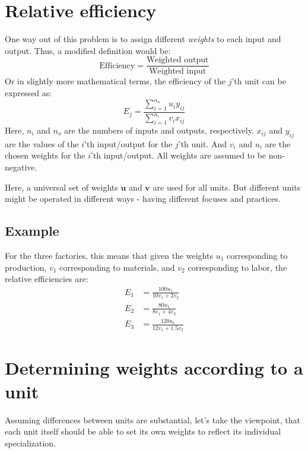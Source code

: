 \documentclass[12pt, a4paper]{article}
\numberwithin{equation}{section}
\begin{document}
\section{Relative efficiency}
One way out of this problem is to assign different \textit{weights} to each input and output. Thus, a modified definition would be:
\begin{equation}
\textrm{Efficiency}=\frac{\textrm{Weighted output}}{\textrm{Weighted input}}
\end{equation}
Or in slightly more mathematical terms, the efficiency of the $j$'th unit can be expressed as:
\begin{equation}
E_j=\frac{\sum_{i=1}^{n_o}u_i y_{ij}}{\sum_{i=1}^{n_i}v_i x_{ij}}
\end{equation}
Here, $n_i$ and $n_o$ are the numbers of inputs and outputs, respectively. $x_{ij}$ and $y_{ij}$ are the values of the $i$'th input/output for the $j$'th unit. And $v_i$ and $u_i$ are the chosen weights for the $i$'th input/output. All weights are assumed to be non-negative.

Here, a universal set of weights $\mathbf{u}$ and $\mathbf{v}$ are used for all units. But different units might be operated in different ways - having different focuses and practices.

\subsection{Example}
For the three factories, this means that given the weights $u_1$ corresponding to production, $v_1$ corresponding to materials, and $v_2$ corresponding to labor, the relative efficiencies are:
\begin{align}
E_1&=\frac{100 u_1}{10 v_1+2 v_2}\\
E_2&=\frac{80 u_1}{8 v_1+4 v_2}\\
E_3&=\frac{120 u_1}{12 v_1+1.5 v_2}
\end{align}

\section{Determining weights according to a unit}
Assuming differences between units are substantial, let's take the viewpoint, that each unit itself should be able to set its own weights to reflect its individual specialization.
\end{document}
